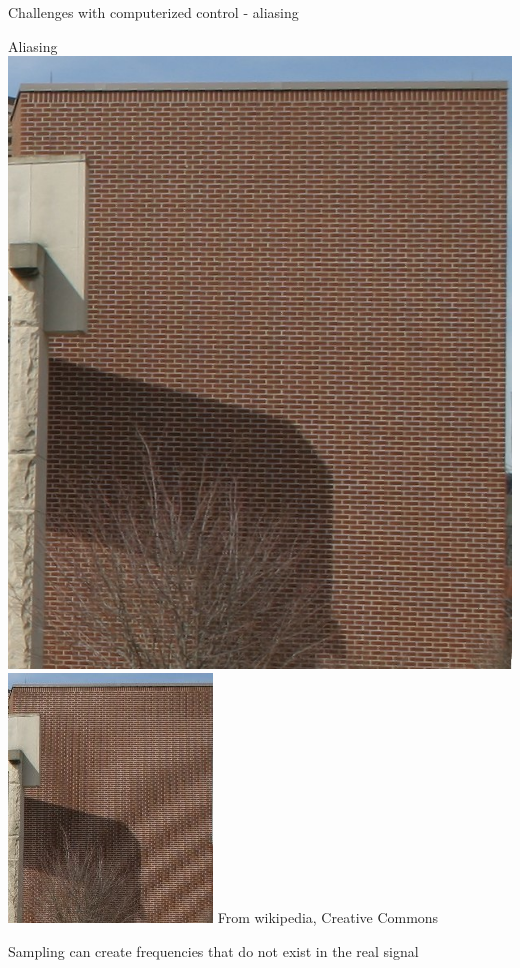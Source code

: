 \documentclass[presentation,aspectratio=169]{beamer}
\begin{document}
\begin{frame}[label={sec:org8f7af18}]{Challenges with computerized control - aliasing}
\begin{block}{Aliasing}
\includegraphics[height=0.6\textheight]{../../figures/Moire_pattern_of_bricks.png} \hspace*{3mm} \includegraphics[height=0.6\textheight]{../../figures/Moire_pattern_of_bricks_small.png}
{\tiny From wikipedia, Creative Commons}

\alert{Sampling can create frequencies that do not exist in the real signal}
\end{block}
\end{frame}
\end{document}
